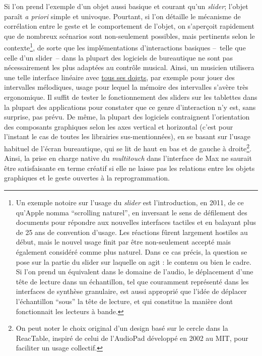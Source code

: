 \indent Si l'on prend l'exemple d'un objet aussi basique et courant qu'un \textit{slider}; l'objet paraît \textit{a priori} simple et univoque. Pourtant, si l'on détaille le mécanisme de corrélation entre le geste et le comportement de l'objet, on s'aperçoit rapidement que de nombreux scénarios sont non-seulement possibles, mais pertinents selon le contexte\footnote{Un exemple notoire sur l'usage du \textit{slider} est l'introduction, en 2011, de ce qu'Apple nomma ``scrolling naturel'', en inversant le sens de défilement des documents pour répondre aux nouvelles interfaces tactiles et en balayant plus de 25 ans de convention d'usage. Les réactions fûrent largement hostiles au début, mais le nouvel usage finit par être non-seulement accepté mais également considéré comme plus naturel. Dans ce cas précis, la question se pose sur la partie du slider sur laquelle on agit : le contenu ou bien le cadre. Si l'on prend un équivalent dans le domaine de l'audio, le déplacement d'une tête de lecture dans un échantillon, tel que couramment représenté dans les interfaces de synthèse granulaire, est aussi approprié que l'idée de déplacer l'échantillon ``sous'' la tête de lecture, et qui constitue la manière dont fonctionnait les lecteurs à bande.}, de sorte que les implémentations d'interactions basiques --~telle que celle d'un slider~-- dans la plupart des logiciels de bureautique ne sont pas nécessairement les plus adaptées au contrôle musical. Ainsi, un musicien utilisera une telle interface linéaire avec \underline{tous ses doigts}, par exemple pour jouer des intervalles mélodiques, usage pour lequel la mémoire des intervalles s'avère très ergonomique. Il suffit de tester le fonctionnement des sliders sur les tablettes dans la plupart des applications pour constater que ce genre d'interaction n'y est, sans surprise, pas prévu. De même, la plupart des logiciels contraignent l'orientation des composants graphiques selon les axes vertical et horizontal (c'est pour l'instant le cas de toutes les librairies sus-mentionnées), en se basant sur l'usage habituel de l'écran bureautique, qui se lit de haut en bas et de gauche à droite\footnote{On peut noter le choix original d'un design basé sur le cercle dans la ReacTable, inspiré de celui de l'AudioPad développé en 2002 au \gls{MIT}, pour faciliter un usage collectif.}.\\
\indent Ainsi, la prise en charge native du \textit{multitouch} dans l'interface de Max ne saurait être satisfaisante en terme créatif si elle ne laisse pas les relations entre les objets graphiques et le geste ouvertes à la reprogrammation. 

